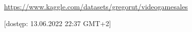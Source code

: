 \begin{thebibliography}{1}
    \url{https://www.kaggle.com/datasets/gregorut/videogamesales}
    
    [dostęp: 13.06.2022 22:37 GMT+2]
\end{thebibliography}